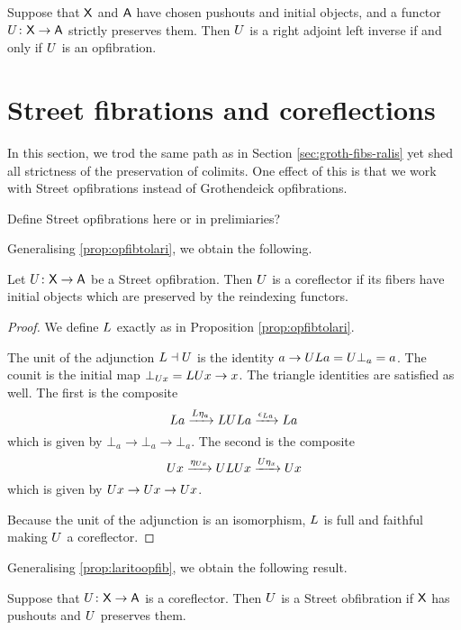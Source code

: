 \documentclass{amsart}
\begin{document}
\begin{thm}\label{thm:mainthm}
Suppose that $\mathsf{X}$ and $\mathsf{A}$ have chosen pushouts and initial objects, and a functor $U\colon\mathsf{X}\to\mathsf{A}$ strictly preserves them. Then $U$ is a right adjoint left inverse if and only if $U$ is an opfibration.
\end{thm}

\section{Street fibrations and coreflections}\label{Streetfibs}

In this section, we trod the same path as in
Section \ref{sec:groth-fibs-ralis} yet shed all
strictness of the preservation of colimits.  One
effect of this is that we work with Street
opfibrations instead of Grothendeick
opfibrations.

{\daniel Define Street opfibrations here or in prelimiaries?}

Generalising \cref{prop:opfibtolari}, we obtain
the following. 

\begin{prop}
  \label{thm:street-opfib-to-corefl}
  Let $ U \colon \mathsf{X} \to \mathsf{A} $ be a Street
  opfibration. Then $ U $ is a coreflector if its
  fibers have initial objects which are preserved
  by the reindexing functors.
\end{prop}

\begin{proof}
  We define $ L $ exactly as in Proposition
  \ref{prop:opfibtolari}. 

  The unit of the adjunction $ L \dashv U $ is the
  identity $ a\to UL a = U\bot_a = a $.  The
  counit is the initial map $ \bot_{U x} = LU x \to
  x $.  The triangle identities are satisfied as
  well. The first is the composite
  \[
    L a
    \xrightarrow{L\eta_a}        LUL a
    \xrightarrow{\epsilon_{L a}} L a
  \]
  which is given by $ \bot_a \to \bot_a \to \bot_a
  $.  The second is the composite
  \[
    U x
    \xrightarrow{\eta_{U x}} ULU x
    \xrightarrow{U\eta_x}    U x
  \]
  which is given by $ U x \to U x \to U x $.

  Because the unit of the adjunction is an
  isomorphism, $ L $ is full and faithful
  \cite[{Prop.~1.3}]{gabrielzisman} making $ U $ a
  coreflector.
\end{proof}

Generalising \cref{prop:laritoopfib}, we obtain the following result.

\begin{prop}
  \label{thm:corefl-to-street-obfib}
  Suppose that $ U \colon \mathsf{X} \to \mathsf{A} $ is a
  coreflector. Then $ U $ is a Street obfibration
  if $ \mathsf{X} $ has pushouts and $ U $ preserves them.
\end{prop}
\end{document}
